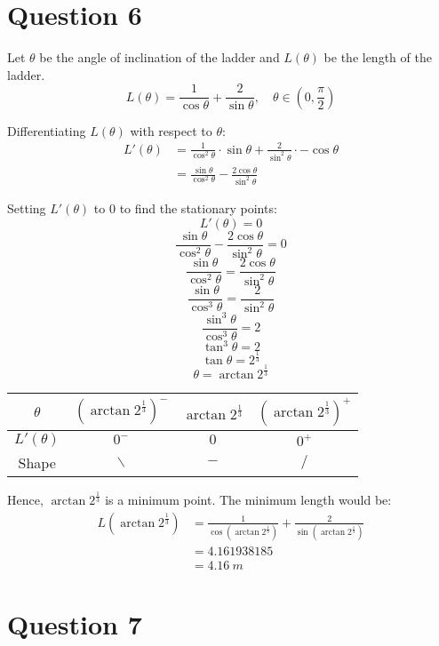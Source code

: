 \documentclass[11pt]{article}
\begin{document}
\section{Question 6}
\label{sec:org1033de6}

Let \(\theta\) be the angle of inclination of the ladder and \(L(\theta)\) be the length of the ladder.
\[L(\theta) = \frac{1}{\cos \theta} + \frac{2}{\sin \theta}, \quad \theta \in \left(0, \frac{\pi}{2} \right)\]

Differentiating \(L(\theta)\) with respect to \(\theta\):
\begin{align*}
L'(\theta) &= \frac{1}{\cos^2 \theta} \cdot \sin \theta + \frac{2}{\sin^2 \theta} \cdot - \cos \theta \\
&= \frac{\sin \theta}{\cos^2 \theta} - \frac{2\cos \theta}{\sin^2 \theta}
\end{align*}

Setting \(L'(\theta)\) to \(0\) to find the stationary points:
\[L'(\theta) = 0\]
\[\frac{\sin \theta}{\cos^2 \theta} - \frac{2 \cos \theta}{\sin^2 \theta} = 0\]
\[\frac{\sin \theta}{\cos^2 \theta} = \frac{2 \cos \theta}{\sin^2 \theta}\]
\[\frac{\sin \theta}{\cos^3 \theta} = \frac{2}{\sin^2 \theta}\]
\[\frac{\sin^3 \theta}{\cos^3 \theta} = 2\]
\[\tan^3 \theta = 2\]
\[\tan \theta = 2^{\frac{1}{3}}\]
\[\theta = \arctan 2^{\frac{1}{3}}\]

\begin{center}
\begin{tabular}{|c|c|c|c|}
\hline
\(\theta\) & \(\left(\arctan 2^{\frac{1}{3}}\right)^-\) & \(\arctan 2^{\frac{1}{3}}\) & \(\left(\arctan 2^{\frac{1}{3}}\right)^+\) \\
\hline
\(L'(\theta)\) & $0^-$ & $0$ & $0^+$ \\
\hline
Shape & $\backslash$ & $-$ & $\slash$ \\
\hline
\end{tabular}
\end{center}

Hence, \(\arctan 2^{\frac{1}{3}}\) is a minimum point. The minimum length would be:
\begin{align*}
L(\arctan 2^{\frac{1}{3}}) &= \frac{1}{\cos \left( \arctan 2^{\frac{1}{3}} \right)} + \frac{2}{\sin \left( \arctan 2^{\frac{1}{3}} \right)} \\
&= 4.161938185 \\
&= \qty{4.16}{\unit{m}}
\end{align*}


\section{Question 7}
\label{sec:orgb073986}
\end{document}
